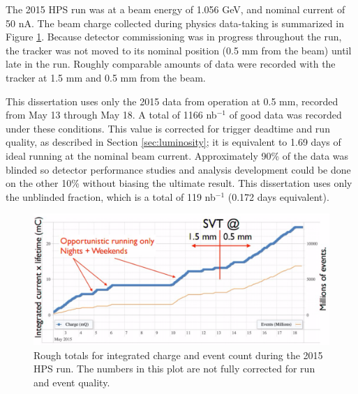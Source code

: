 The 2015 HPS run was at a beam energy of 1.056 GeV, and nominal current of 50 nA.
The beam charge collected during physics data-taking is summarized in Figure \ref{fig:beamtime}.
Because detector commissioning was in progress throughout the run, the tracker was not moved to its nominal position (0.5 mm from the beam) until late in the run.
Roughly comparable amounts of data were recorded with the tracker at 1.5 mm and 0.5 mm from the beam.

This dissertation uses only the 2015 data from operation at 0.5 mm, recorded from May 13 through May 18.
A total of 1166 nb$^{-1}$ of good data was recorded under these conditions.
This value is corrected for trigger deadtime and run quality, as described in Section \ref{sec:luminosity}; it is equivalent to 1.69 days of ideal running at the nominal beam current.
Approximately 90\% of the data was blinded so detector performance studies and analysis development could be done on the other 10\% without biasing the ultimate result.
This dissertation uses only the unblinded fraction, which is a total of 119 nb$^{-1}$ (0.172 days equivalent).

\begin{figure}[ht]
    \includegraphics[width=\textwidth]{intro/figs/engrun-beamtime}
    \caption{Rough totals for integrated charge and event count during the 2015 HPS run. The numbers in this plot are not fully corrected for run and event quality.}
    \label{fig:beamtime}
\end{figure}

